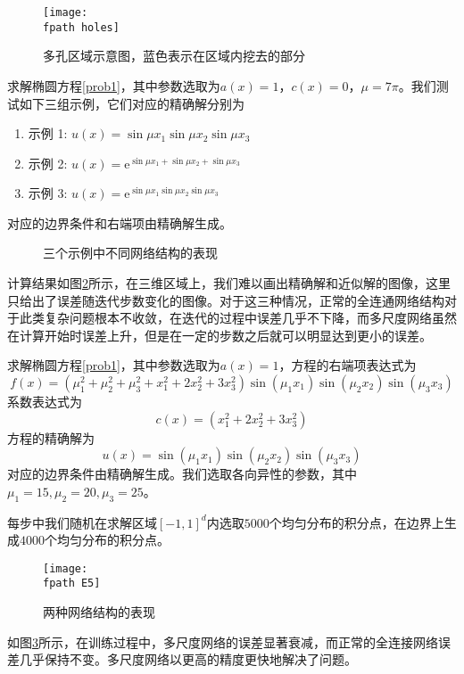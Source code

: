 \begin{figure}[htbp]
\centering
\texttt{[image: \\fpath holes]}
\caption{多孔区域示意图，蓝色表示在区域内挖去的部分}
\label{func6}
\end{figure}

求解椭圆方程\ref{prob1}，其中参数选取为$a(x)=1$，$c(x)=0$，$\mu=7\pi$。我们测试如下三组示例，它们对应的精确解分别为
\begin{enumerate}
\item  示例 1: $ u(x) = \sin \mu x_1 \sin \mu x_2 \sin \mu x_3 $
\item  示例 2: $ u(x) = {\mathrm{e}}^{\sin \mu x_1 + \sin \mu x_2 + \sin \mu x_3} $
\item  示例 3: $ u(x) = \mathrm{e}^{ \sin \mu x_1 \sin \mu x_2 \sin \mu x_3 } $
\end{enumerate}
对应的边界条件和右端项由精确解生成。

\begin{figure}[htbp]
\centering
{}
\caption{三个示例中不同网络结构的表现}
\label{e8}
\end{figure}

计算结果如图\ref{e8}所示，在三维区域上，我们难以画出精确解和近似解的图像，这里只给出了误差随迭代步数变化的图像。对于这三种情况，正常的全连通网络结构对于此类复杂问题根本不收敛，在迭代的过程中误差几乎不下降，而多尺度网络虽然在计算开始时误差上升，但是在一定的步数之后就可以明显达到更小的误差。


求解椭圆方程\ref{prob1}，其中参数选取为$a(x)=1$，方程的右端项表达式为
\begin{equation}
f(x) = (\mu_1^2 + \mu_2^2 + \mu_3^2 + x_1^2 + 2 x_2^2 + 3 x_3^2) \sin(\mu_1 x_1) \sin(\mu_2 x_2) \sin(\mu_3 x_3)
\end{equation}
系数表达式为
\begin{equation}
c(x) = (x_1^2 + 2 x_2^2 + 3 x_3^2)
\end{equation}
方程的精确解为
\begin{equation}
u(x) = \sin(\mu_1 x_1) \sin(\mu_2 x_2) \sin(\mu_3 x_3)
\end{equation}
对应的边界条件由精确解生成。我们选取各向异性的参数，其中$\mu_1=15, \mu_2=20, \mu_3=25$。

每步中我们随机在求解区域$[-1, 1]^d$内选取$5000$个均匀分布的积分点，在边界上生成$4000$个均匀分布的积分点。

\begin{figure}[htbp]
\centering
\texttt{[image: \\fpath E5]}
\caption{两种网络结构的表现}
\label{e5}
\end{figure}

如图\ref{e5}所示，在训练过程中，多尺度网络的误差显著衰减，而正常的全连接网络误差几乎保持不变。多尺度网络以更高的精度更快地解决了问题。
